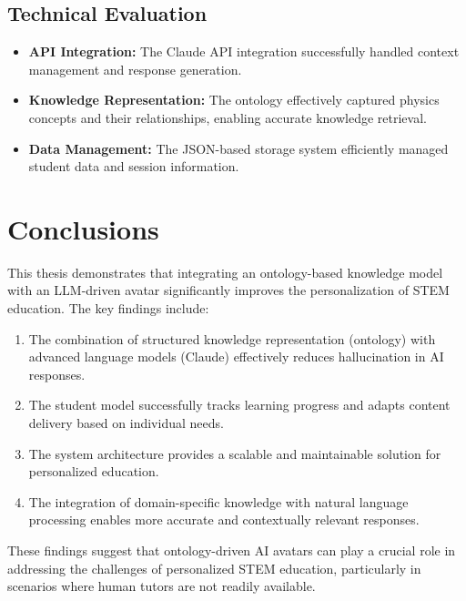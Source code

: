 \documentclass[a4paper,11pt,oneside]{article}
\begin{document}
  \subsection{Technical Evaluation}
  \begin{itemize}
    \item \textbf{API Integration:} The Claude API integration successfully handled context management and response generation.
    
    \item \textbf{Knowledge Representation:} The ontology effectively captured physics concepts and their relationships, enabling accurate knowledge retrieval.
    
    \item \textbf{Data Management:} The JSON-based storage system efficiently managed student data and session information.
  \end{itemize}

  \section{Conclusions}

  This thesis demonstrates that integrating an ontology-based knowledge model with an LLM-driven avatar significantly improves the 
  personalization of STEM education. The key findings include:

  \begin{enumerate}
    \item The combination of structured knowledge representation (ontology) with advanced language models (Claude) effectively reduces hallucination in AI responses.
    
    \item The student model successfully tracks learning progress and adapts content delivery based on individual needs.
    
    \item The system architecture provides a scalable and maintainable solution for personalized education.
    
    \item The integration of domain-specific knowledge with natural language processing enables more accurate and contextually relevant responses.
  \end{enumerate}

  These findings suggest that ontology-driven AI avatars can play a crucial role in addressing the challenges of personalized STEM education, 
  particularly in scenarios where human tutors are not readily available.
\end{document}
